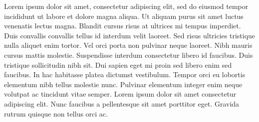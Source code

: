 Lorem ipsum dolor sit amet, consectetur adipiscing elit, sed do eiusmod tempor incididunt ut labore et dolore magna aliqua. Ut aliquam purus sit amet luctus venenatis lectus magna. Blandit cursus risus at ultrices mi tempus imperdiet. Duis convallis convallis tellus id interdum velit laoreet. Sed risus ultricies tristique nulla aliquet enim tortor. Vel orci porta non pulvinar neque laoreet. Nibh mauris cursus mattis molestie. Suspendisse interdum consectetur libero id faucibus. Duis tristique sollicitudin nibh sit. Dui sapien eget mi proin sed libero enim sed faucibus. In hac habitasse platea dictumst vestibulum. Tempor orci eu lobortis elementum nibh tellus molestie nunc. Pulvinar elementum integer enim neque volutpat ac tincidunt vitae semper. Lorem ipsum dolor sit amet consectetur adipiscing elit. Nunc faucibus a pellentesque sit amet porttitor eget. Gravida rutrum quisque non tellus orci ac.

